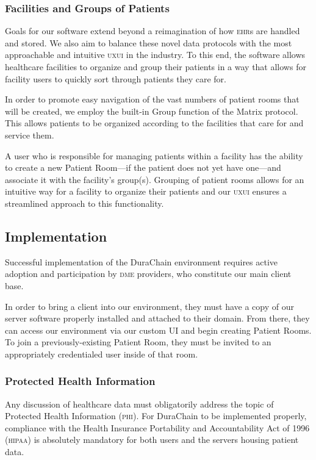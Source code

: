 \subsubsection{Facilities and Groups of Patients}
Goals for our software extend beyond a reimagination of how \textsc{ehr}s are handled and stored. We also aim to balance these novel data protocols with the most approachable and intuitive \textsc{uxui} in the industry. To this end, the software allows healthcare facilities to organize and group their patients in a way that allows for facility users to quickly sort through patients they care for.%
\begin{figure}[ht]
\end{figure}

In order to promote easy navigation of the vast numbers of patient rooms that will be created, we employ the built-in Group function of the Matrix protocol. This allows patients to be organized according to the facilities that care for and service them.%

A user who is responsible for managing patients within a facility has the ability to create a new Patient Room---if the patient does not yet have one---and associate it with the facility's group(s). Grouping of patient rooms allows for an intuitive way for a facility to organize their patients and our \textsc{uxui} ensures a streamlined approach to this functionality.%

 \subsection{Implementation}
 Successful implementation of the DuraChain environment requires active adoption and participation by \textsc{dme} providers, who constitute our main client base.%

 In order to bring a client into our environment, they must have a copy of our server software properly installed and attached to their domain. From there, they can access our environment via our custom UI and begin creating Patient Rooms. To join a previously-existing Patient Room, they must be invited to an appropriately credentialed user inside of that room.%

\subsubsection{Protected Health Information}
Any discussion of healthcare data must obligatorily address the topic of Protected Health Information (\textsc{phi}). For DuraChain to be implemented properly, compliance with the Health Insurance Portability and Accountability Act of 1996 (\textsc{hipaa})\cite{HIPAA} is absolutely mandatory for both users and the servers housing patient data.%

